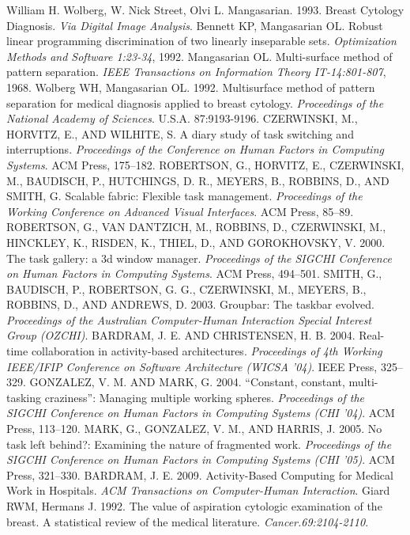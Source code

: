 \begin{thebibliography}{}
\bibitem{} William H. Wolberg, W. Nick Street, Olvi L. Mangasarian. 1993. Breast Cytology Diagnosis. \emph{Via Digital Image Analysis}.
\bibitem{} Bennett KP, Mangasarian OL. Robust linear programming discrimination of two linearly inseparable sets. \emph{Optimization Methods and Software 1:23-34}, 1992.
\bibitem{} Mangasarian OL. Multi-surface method of pattern separation. \emph{IEEE Transactions on Information Theory IT-14:801-807}, 1968.
\bibitem{} Wolberg WH, Mangasarian OL. 1992. Multisurface method of pattern separation for medical diagnosis applied to breast cytology. \emph{Proceedings of the National Academy of Sciences}. U.S.A. 87:9193-9196.
\bibitem{} CZERWINSKI, M., HORVITZ, E., AND WILHITE, S. A diary study of task switching and interruptions. \emph{Proceedings of the Conference on Human Factors in Computing Systems}. ACM Press, 175–182.
\bibitem{} ROBERTSON, G., HORVITZ, E., CZERWINSKI, M., BAUDISCH, P., HUTCHINGS, D. R., MEYERS, B., ROBBINS, D., AND SMITH, G. Scalable fabric: Flexible task management. \emph{Proceedings of the Working Conference on Advanced Visual Interfaces}. ACM Press, 85–89.
\bibitem{} ROBERTSON, G., VAN DANTZICH, M., ROBBINS, D., CZERWINSKI, M., HINCKLEY, K., RISDEN, K., THIEL, D., AND GOROKHOVSKY, V. 2000. The task gallery: a 3d window manager. \emph{Proceedings of the SIGCHI Conference on Human Factors in Computing Systems}. ACM Press, 494–501.
\bibitem{} SMITH, G., BAUDISCH, P., ROBERTSON, G. G., CZERWINSKI, M., MEYERS, B., ROBBINS, D., AND ANDREWS, D. 2003. Groupbar: The taskbar evolved. \emph{Proceedings of the Australian Computer-Human Interaction Special Interest Group (OZCHI)}.
\bibitem{} BARDRAM, J. E. AND CHRISTENSEN, H. B. 2004. Real-time collaboration in activity-based architectures. \emph{Proceedings of 4th Working IEEE/IFIP Conference on Software Architecture (WICSA ’04)}. IEEE Press, 325–329.
\bibitem{} GONZALEZ, V. M. AND MARK, G. 2004. “Constant, constant, multi-tasking craziness”: Managing multiple working spheres. \emph{Proceedings of the SIGCHI Conference on Human Factors in Computing Systems (CHI ’04)}. ACM Press, 113–120.
\bibitem{} MARK, G., GONZALEZ, V. M., AND HARRIS, J. 2005. No task left behind?: Examining the nature of fragmented work. \emph{Proceedings of the SIGCHI Conference on Human Factors in Computing Systems (CHI ’05)}. ACM Press, 321–330.
\bibitem{} BARDRAM, J. E. 2009. Activity-Based Computing for Medical Work in Hospitals. \emph{ACM Transactions on Computer-Human Interaction}.
\bibitem{} Giard RWM, Hermans J. 1992. The value of aspiration cytologic examination of the breast. A statistical review of the medical literature. \emph{Cancer.69:2104-2110}.

\end{thebibliography}
